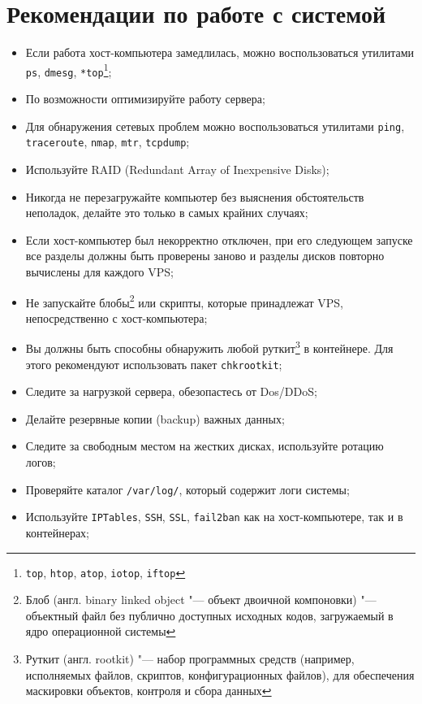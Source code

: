 \section{Рекомендации по работе с системой}
\begin{itemize}
    \item Если работа хост-компьютера замедлилась, можно воспользоваться утилитами \texttt{ps}, \texttt{dmesg}, \texttt{*top}\footnote{\texttt{top}, \texttt{htop}, \texttt{atop}, \texttt{iotop}, \texttt{iftop}};
    \item По возможности оптимизируйте работу сервера;
    \item Для обнаружения сетевых проблем можно воспользоваться утилитами \texttt{ping}, \texttt{traceroute}, \texttt{nmap}, \texttt{mtr}, \texttt{tcpdump};
    \item Используйте RAID (Redundant Array of Inexpensive Disks);
    \item Никогда не перезагружайте компьютер без выяснения обстоятельств неполадок, делайте это только в самых крайних случаях;
    \item Если хост-компьютер был некорректно отключен, при его следующем запуске все разделы должны быть проверены заново и разделы дисков повторно вычислены для каждого VPS;
    \item Не запускайте блобы\footnote{Блоб (англ. binary linked object "--- объект двоичной компоновки) "--- объектный файл без публично доступных исходных кодов, загружаемый в ядро операционной системы} или скрипты, которые принадлежат VPS, непосредственно с хост-компьютера;
    \item Вы должны быть способны обнаружить любой руткит\footnote{Руткит (англ. rootkit) "--- набор программных средств (например, исполняемых файлов, скриптов, конфигурационных файлов), для обеспечения маскировки объектов, контроля и сбора данных} в контейнере. Для этого рекомендуют использовать пакет \texttt{chkrootkit};
    \item Следите за нагрузкой сервера, обезопастесь от Dos/DDoS;
    \item Делайте резервные копии (backup) важных данных;
    \item Следите за свободным местом на жестких дисках, используйте ротацию логов;
    \item Проверяйте каталог \texttt{/var/log/}, который содержит логи системы;
    \item Используйте \texttt{IPTables}, \texttt{SSH}, \texttt{SSL}, \texttt{fail2ban} как на хост-компьютере, так и в контейнерах;

\end{itemize}
